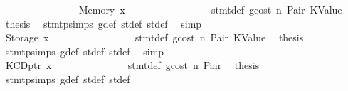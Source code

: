 \begin{isabellebody}
\isanewline
\ \ \ \ \ \ \ \ \ \ \ \ \ \ \isamarkupfalse%
\ {\isacharparenleft}{\kern0pt}Memory\ x{}{\isacharparenright}{\kern0pt}\isanewline
\ \ \ \ \ \ \ \ \ \ \ \ \ \ \isamarkupfalse%
\ {}{\isacharparenleft}{\kern0pt}{}{\isacharparenright}{\kern0pt}\ stmt{\isacharunderscore}{\kern0pt}def\ gcost\ n\ Pair\ KValue\ \isamarkupfalse%
\ {\isacharquery}{\kern0pt}thesis\ \isamarkupfalse%
\ stmt{\isachardot}{\kern0pt}psimps{\isacharparenleft}{\kern0pt}{}{\isacharparenright}{\kern0pt}\ g{\isacharunderscore}{\kern0pt}def\ st{\isacharprime}{\kern0pt}{\isacharunderscore}{\kern0pt}def\ st{\isacharprime}{\kern0pt}{\isacharprime}{\kern0pt}{\isacharunderscore}{\kern0pt}def\ \isamarkupfalse%
\ simp\isanewline
\ \ \ \ \ \ \ \ \ \ \ \ \isamarkupfalse%
\isanewline
\ \ \ \ \ \ \ \ \ \ \ \ \ \ \isamarkupfalse%
\ {\isacharparenleft}{\kern0pt}Storage\ x{}{\isacharparenright}{\kern0pt}\isanewline
\ \ \ \ \ \ \ \ \ \ \ \ \ \ \isamarkupfalse%
\ {}{\isacharparenleft}{\kern0pt}{}{\isacharparenright}{\kern0pt}\ stmt{\isacharunderscore}{\kern0pt}def\ gcost\ n\ Pair\ KValue\ \isamarkupfalse%
\ {\isacharquery}{\kern0pt}thesis\ \isamarkupfalse%
\ stmt{\isachardot}{\kern0pt}psimps{\isacharparenleft}{\kern0pt}{}{\isacharparenright}{\kern0pt}\ g{\isacharunderscore}{\kern0pt}def\ st{\isacharprime}{\kern0pt}{\isacharunderscore}{\kern0pt}def\ st{\isacharprime}{\kern0pt}{\isacharprime}{\kern0pt}{\isacharunderscore}{\kern0pt}def\ \isamarkupfalse%
\ simp\isanewline
\ \ \ \ \ \ \ \ \ \ \ \ \isamarkupfalse%
\isanewline
\ \ \ \ \ \ \ \ \ \ \isamarkupfalse%
\isanewline
\ \ \ \ \ \ \ \ \ \ \ \ \isamarkupfalse%
\ {\isacharparenleft}{\kern0pt}KCDptr\ x{}{\isacharparenright}{\kern0pt}\isanewline
\ \ \ \ \ \ \ \ \ \ \ \ \isamarkupfalse%
\ {}{\isacharparenleft}{\kern0pt}{}{\isacharparenright}{\kern0pt}\ stmt{\isacharunderscore}{\kern0pt}def\ gcost\ n\ Pair\ \isamarkupfalse%
\ {\isacharquery}{\kern0pt}thesis\ \isamarkupfalse%
\ stmt{\isachardot}{\kern0pt}psimps{\isacharparenleft}{\kern0pt}{}{\isacharparenright}{\kern0pt}\ g{\isacharunderscore}{\kern0pt}def\ st{\isacharprime}{\kern0pt}{\isacharunderscore}{\kern0pt}def\ st{\isacharprime}{\kern0pt}{\isacharprime}{\kern0pt}{\isacharunderscore}{\kern0pt}def\ \isamarkupfalse%

\end{isabellebody}

